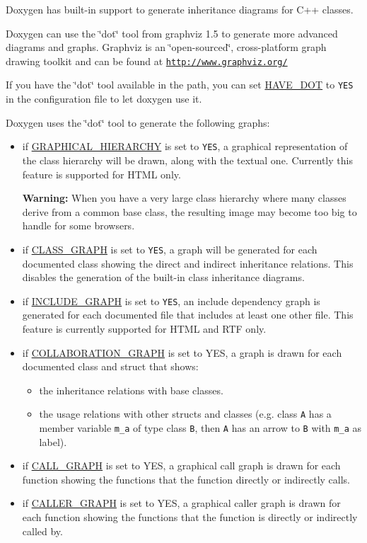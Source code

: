 Doxygen has built-in support to generate inheritance diagrams for C++ classes.

Doxygen can use the \char`\"{}dot\char`\"{} tool from graphviz 1.5 to generate more advanced diagrams and graphs. Graphviz is an \char`\"{}open-sourced\char`\"{}, cross-platform graph drawing toolkit and can be found at \href{http://www.graphviz.org/}{\tt http://www.graphviz.org/}

If you have the \char`\"{}dot\char`\"{} tool available in the path, you can set \hyperlink{config_cfg_have_dot}{HAVE\_\-DOT} to {\tt YES} in the configuration file to let doxygen use it.

Doxygen uses the \char`\"{}dot\char`\"{} tool to generate the following graphs: \begin{itemize}
\item if \hyperlink{config_cfg_graphical_hierarchy}{GRAPHICAL\_\-HIERARCHY} is set to {\tt YES}, a graphical representation of the class hierarchy will be drawn, along with the textual one. Currently this feature is supported for HTML only.\par
 {\bf Warning:} When you have a very large class hierarchy where many classes derive from a common base class, the resulting image may become too big to handle for some browsers. \item if \hyperlink{config_cfg_class_graph}{CLASS\_\-GRAPH} is set to {\tt YES}, a graph will be generated for each documented class showing the direct and indirect inheritance relations. This disables the generation of the built-in class inheritance diagrams. \item if \hyperlink{config_cfg_include_graph}{INCLUDE\_\-GRAPH} is set to {\tt YES}, an include dependency graph is generated for each documented file that includes at least one other file. This feature is currently supported for HTML and RTF only. \item if \hyperlink{config_cfg_collaboration_graph}{COLLABORATION\_\-GRAPH} is set to YES, a graph is drawn for each documented class and struct that shows: \begin{itemize}
\item the inheritance relations with base classes. \item the usage relations with other structs and classes (e.g. class {\tt A} has a member variable {\tt m\_\-a} of type class {\tt B}, then {\tt A} has an arrow to {\tt B} with {\tt m\_\-a} as label). \end{itemize}
\item if \hyperlink{config_cfg_call_graph}{CALL\_\-GRAPH} is set to YES, a graphical call graph is drawn for each function showing the functions that the function directly or indirectly calls. \item if \hyperlink{config_cfg_caller_graph}{CALLER\_\-GRAPH} is set to YES, a graphical caller graph is drawn for each function showing the functions that the function is directly or indirectly called by. \end{itemize}


